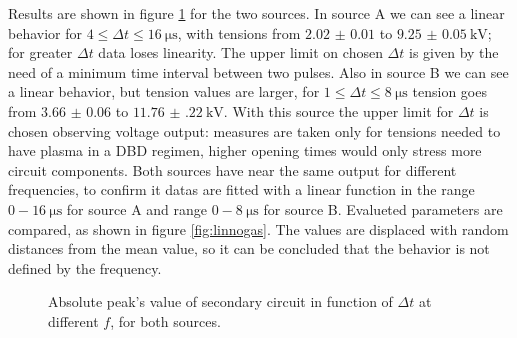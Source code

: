 Results are shown in figure \ref{fig:nogas} for the two sources.
In source A we can see a linear behavior for $4 \le \Delta t \le \SI{16}{\micro\second}$, with tensions from $\num{2.02(1)}$ to $\SI{9.25(5)}{\kilo\volt}$; for greater $\Delta t$ data loses linearity. The upper limit on chosen $\Delta t$ is given by the need of a minimum time interval between two pulses.
Also in source B we can see a linear behavior, but tension values are larger, for $1 \le \Delta t \le \SI{8}{\micro\second}$ tension goes from $\num{3.66(6)}$ to $\SI{11.76(22)}{\kilo\volt}$. With this source the upper limit for $\Delta t$ is chosen observing voltage output: measures are taken only for tensions needed to have plasma in a DBD regimen, higher opening times would only stress more circuit components.
Both sources have near the same output for different frequencies, to confirm it datas are fitted with a linear function in the range $0-\SI{16}{\micro\second}$ for source A and range $0-\SI{8}{\micro\second}$ for source B. Evalueted parameters are compared, as shown in figure \ref{fig:linnogas}. The values are displaced with random distances from the mean value, so it can be concluded that the behavior is not defined by the frequency.
\begin{figure}
 \centering
 
 \caption{Absolute peak's value of secondary circuit in function of $\Delta t$ at different $f$, for both sources.}
 \label{fig:nogas}
\end{figure}

